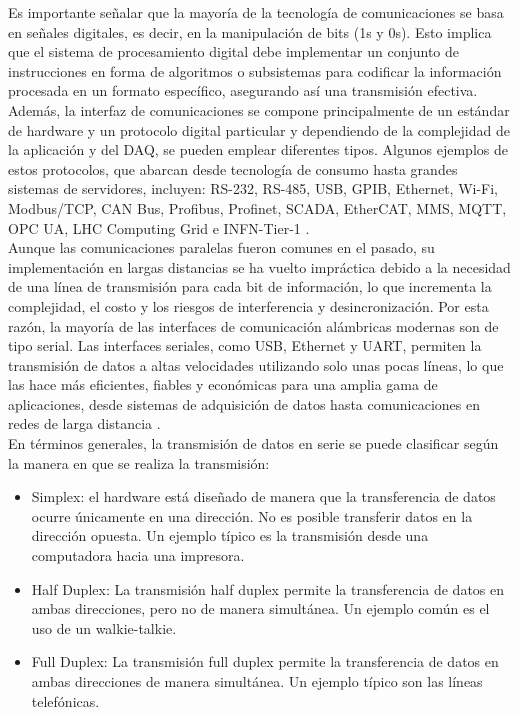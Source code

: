 \documentclass[]{book}
\begin{document}
\noindent Es importante señalar que la mayoría de la tecnología de comunicaciones se basa en señales digitales, es decir, en la manipulación de bits (1s y 0s). Esto implica que el sistema de procesamiento digital debe implementar un conjunto de instrucciones en forma de algoritmos o subsistemas para codificar la información procesada en un formato específico, asegurando así una transmisión efectiva. Además, la interfaz de comunicaciones se compone principalmente de un estándar de hardware y un protocolo digital particular y dependiendo de la complejidad de la aplicación y del DAQ, se pueden emplear diferentes tipos. Algunos ejemplos de estos protocolos, que abarcan desde tecnología de consumo hasta grandes sistemas de servidores, incluyen: RS-232, RS-485, USB, GPIB, Ethernet, Wi-Fi, Modbus/TCP, CAN Bus, Profibus, Profinet, SCADA, EtherCAT, MMS, MQTT, OPC UA, LHC Computing Grid e INFN-Tier-1 \cite{zurawski2014industrial} \cite{bortolotti2012infn}.\\

\noindent Aunque las comunicaciones paralelas fueron comunes en el pasado, su implementación en largas distancias se ha vuelto impráctica debido a la necesidad de una línea de transmisión para cada bit de información, lo que incrementa la complejidad, el costo y los riesgos de interferencia y desincronización. Por esta razón, la mayoría de las interfaces de comunicación alámbricas modernas son de tipo serial. Las interfaces seriales, como USB, Ethernet y UART, permiten la transmisión de datos a altas velocidades utilizando solo unas pocas líneas, lo que las hace más eficientes, fiables y económicas para una amplia gama de aplicaciones, desde sistemas de adquisición de datos hasta comunicaciones en redes de larga distancia \cite{eeeguide_serial_communication_8251}.\\

\noindent En términos generales, la transmisión de datos en serie se puede clasificar según la manera en que se realiza la transmisión:
 \begin{itemize}
    \item Simplex: el hardware está diseñado de manera que la transferencia de datos ocurre únicamente en una dirección. No es posible transferir datos en la dirección opuesta. Un ejemplo típico es la transmisión desde una computadora hacia una impresora.
    \item Half Duplex: La transmisión half duplex permite la transferencia de datos en ambas direcciones, pero no de manera simultánea. Un ejemplo común es el uso de un walkie-talkie.
    \item Full Duplex: La transmisión full duplex permite la transferencia de datos en ambas direcciones de manera simultánea. Un ejemplo típico son las líneas telefónicas.
 \end{itemize}
\end{document}
